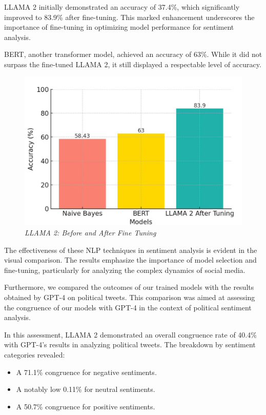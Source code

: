 \documentclass[10pt]{article}
\begin{document}
\begin{multicols}{2}
LLAMA 2 initially demonstrated an accuracy of 37.4\%, which significantly improved to 83.9\% after fine-tuning. This marked enhancement underscores the importance of fine-tuning in optimizing model performance for sentiment analysis.

BERT, another transformer model, achieved an accuracy of 63\%. While it did not surpass the fine-tuned LLAMA 2, it still displayed a respectable level of accuracy.

\begin{figure}[H]
    \centering
    \includegraphics[width=1\linewidth]{fig2.png}
    \caption{\justifying \textit{LLAMA 2: Before and After Fine Tuning}}
    \label{fig:FIG 1}
\end{figure}

The effectiveness of these NLP techniques in sentiment analysis is evident in the visual comparison. The results emphasize the importance of model selection and fine-tuning, particularly for analyzing the complex dynamics of social media.

Furthermore, we compared the outcomes of our trained models with the results obtained by GPT-4 on political tweets. This comparison was aimed at assessing the congruence of our models with GPT-4 in the context of political sentiment analysis.

In this assessment, LLAMA 2 demonstrated an overall congruence rate of 40.4\% with GPT-4’s results in analyzing political tweets. The breakdown by sentiment categories revealed:
\begin{itemize}
    \item A 71.1\% congruence for negative sentiments.
    \item A notably low 0.11\% for neutral sentiments.
    \item A 50.7\% congruence for positive sentiments.
\end{itemize}


\end{multicols}
\end{document}
